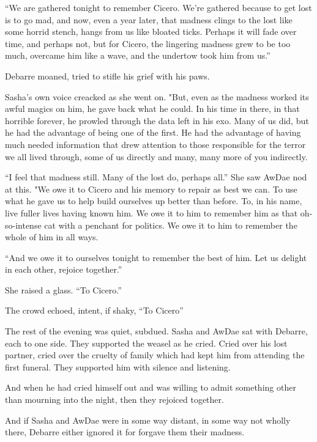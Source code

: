``We are gathered tonight to remember Cicero. We're gathered because to get lost is to go mad, and now, even a year later, that madness clings to the lost like some horrid stench, hangs from us like bloated ticks. Perhaps it will fade over time, and perhaps not, but for Cicero, the lingering madness grew to be too much, overcame him like a wave, and the undertow took him from us.''

Debarre moaned, tried to stifle his grief with his paws.

Sasha's own voice creacked as she went on. "But, even as the madness worked its awful magics on him, he gave back what he could. In his time in there, in that horrible forever, he prowled through the data left in his exo. Many of us did, but he had the advantage of being one of the first. He had the advantage of having much needed information that drew attention to those responsible for the terror we all lived through, some of us directly and many, many more of you indirectly.

``I feel that madness still. Many of the lost do, perhaps all.'' She saw AwDae nod at this. "We owe it to Cicero and his memory to repair as best we can. To use what he gave us to help build ourselves up better than before. To, in his name, live fuller lives having known him. We owe it to him to remember him as that oh-so-intense cat with a penchant for politics. We owe it to him to remember the whole of him in all ways.

``And we owe it to ourselves tonight to remember the best of him. Let us delight in each other, rejoice together.''

She raised a glass. ``To Cicero.''

The crowd echoed, intent, if shaky, ``To Cicero''

The rest of the evening was quiet, subdued. Sasha and AwDae sat with Debarre, each to one side. They supported the weasel as he cried. Cried over his lost partner, cried over the cruelty of family which had kept him from attending the first funeral. They supported him with silence and listening.

And when he had cried himself out and was willing to admit something other than mourning into the night, then they rejoiced together.

And if Sasha and AwDae were in some way distant, in some way not wholly there, Debarre either ignored it for forgave them their madness.

